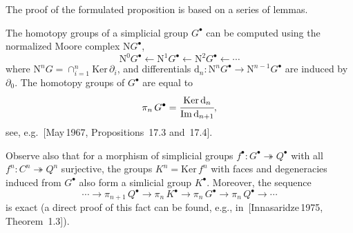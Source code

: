 \documentclass[oneside, 11pt]{amsart} \pdfoutput=1
\begin{document}
The proof of the formulated proposition is based on a series of lemmas. 

The homotopy groups of a simplicial group $G^\bullet$ can be computed using the normalized Moore complex $\mathrm NG^\bullet$,
$$
\mathrm N^0G^\bullet\leftarrow\mathrm N^1G^\bullet\leftarrow\mathrm N^2G^\bullet\leftarrow\cdots
$$
where $\mathrm N^nG=\cap_{i=1}^n\mathrm{Ker}\,\partial_i$, and differentials $\mathrm d_n\colon\mathrm N^{n}G^\bullet\rightarrow\mathrm N^{n-1}G^\bullet$ are induced by $\partial_0$. The homotopy groups of $G^\bullet$ are equal to
$$
\pi_n\,G^\bullet = \cfrac{\mathrm{Ker}\,\mathrm d_n}{\mathrm{Im}\,\mathrm d_{n+1}},
$$
see, e.g.~[May\,1967, Propositions~17.3 and~17.4].

Observe also that for a morphism of simplicial groups $f^\bullet\colon G^\bullet\twoheadrightarrow Q^\bullet$ with all $f^n\colon C^n\twoheadrightarrow Q^n$ surjective, the groups $K^n=\mathrm{Ker}\,f^n$ with faces and degeneracies induced from $G^\bullet$ also form a simlicial group $K^\bullet$. Moreover, the sequence
$$
\cdots\rightarrow\pi_{n+1}\,Q^\bullet\rightarrow\pi_n\,K^\bullet\rightarrow\pi_n\,G^\bullet\rightarrow\pi_n\,Q^\bullet\rightarrow\cdots
$$
is exact (a direct proof of this fact can be found, e.g., in~[Innasaridze\,1975, Theorem~1.3]).
\end{document}

